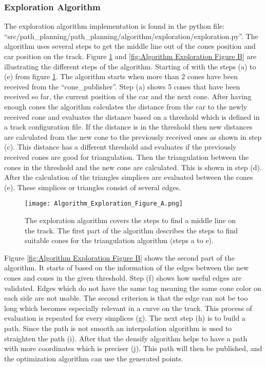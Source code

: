 \subsubsection{Exploration Algorithm} \label{sec:Exploration Algorithm}
The exploration algorithm implementation is found in the python file: ``src/path\_planning/path\_planning/algorithm/exploration/exploration.py''. The algorithm uses several steps to get the middle line out of the cones position and car position on the track. Figure \ref{fig:Algorithm Exploration Figure A} and \ref{fig:Algorithm Exploration Figure B} are illustrating the different steps of the algorithm. Starting of with the steps (a) to (e) from figure \ref{fig:Algorithm Exploration Figure A}. The algorithm starts when more than 2 cones have been received from the ``cone\_publisher''. Step (a) shows 5 cones that have been received so far, the current position of the car and the next cone. After having enough cones the algorithm calculates the distance from the car to the newly received cone and evaluates the distance based on a threshold which is defined in a track configuration file. If the distance is in the threshold then new distances are calculated from the new cone to the previously received ones as shown in step (c). This distance has a different threshold and evaluates if the previously received cones are good for triangulation. Then the triangulation between the cones in the threshold and the new cone are calculated. This is shown in step (d). After the calculation of the triangles simplices are evaluated between the cones (e). These simplices or triangles consist of several edges.

\begin{figure}[H]
    \centering
    \texttt{[image: Algorithm\_Exploration\_Figure\_A.png]}
    \caption{The exploration algorithm covers the steps to find a middle line on the track. The first part of the algorithm describes the steps to find suitable cones for the triangulation algorithm (steps a to e).}
    \label{fig:Algorithm Exploration Figure A}
\end{figure}

Figure \ref{fig:Algorithm Exploration Figure B} shows the second part of the algorithm. It starts of based on the information of the edges between the new cones and cones in the given threshold. Step (f) shows how useful edges are validated. Edges which do not have the same tag meaning the same cone color on each side are not usable. The second criterion is that the edge can not be too long which becomes especially relevant in a curve on the track. This process of evaluation is repeated for every simplices (g). The next step (h) is to build a path. Since the path is not smooth an interpolation algorithm is used to straighten the path (i). After that the densify algorithm helps to have a path with more coordinates which is preciser (j). This path will then be published, and the optimization algorithm can use the generated points.

